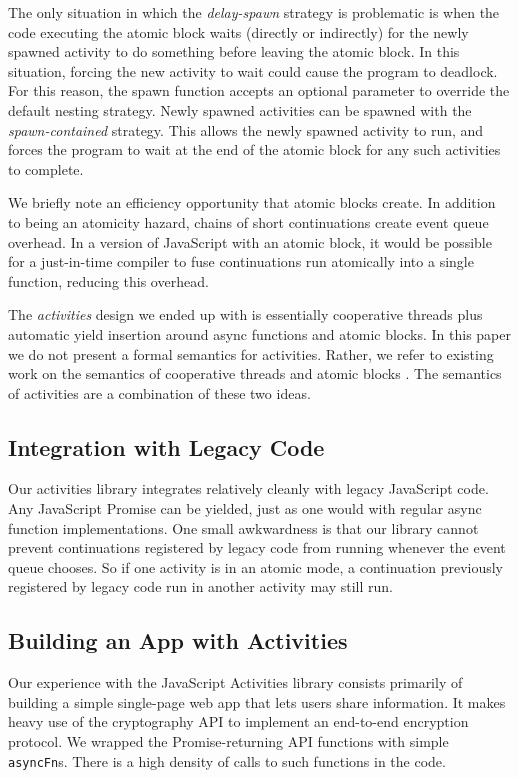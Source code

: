 \documentclass[sigplan,10pt,review,anonymous]{acmart}\settopmatter{printfolios=true,printccs=false,printacmref=false}
\begin{document}
The only situation in which the \emph{delay-spawn} strategy is problematic is when the code executing the atomic block waits (directly or indirectly) for the newly spawned activity to do something before leaving the atomic block.
In this situation, forcing the new activity to wait could cause the program to deadlock.
For this reason, the spawn function accepts an optional parameter to override the default nesting strategy.
Newly spawned activities can be spawned with the \emph{spawn-contained} strategy.
This allows the newly spawned activity to run, and forces the program to wait at the end of the atomic block for any such activities to complete.

We briefly note an efficiency opportunity that atomic blocks create.
In addition to being an atomicity hazard, chains of short continuations create event queue overhead.
In a version of JavaScript with an atomic block, it would be possible for a just-in-time compiler to fuse continuations run atomically into a single function, reducing this overhead.

The \emph{activities} design we ended up with is essentially cooperative threads plus automatic yield insertion around async functions and atomic blocks.
In this paper we do not present a formal semantics for activities.
Rather, we refer to existing work on the semantics of cooperative threads \cite{Abadi2009} and atomic blocks \cite{Moore2008}.
The semantics of activities are a combination of these two ideas.

\subsection{Integration with Legacy Code}

Our activities library integrates relatively cleanly with legacy JavaScript code.
Any JavaScript Promise can be yielded, just as one would with regular async function implementations.
One small awkwardness is that our library cannot prevent continuations registered by legacy code from running whenever the event queue chooses.
So if one activity is in an atomic mode, a continuation previously registered by legacy code run in another activity may still run.

\subsection{Building an App with Activities}

Our experience with the JavaScript Activities library consists primarily of building a simple single-page web app that lets users share information.
It makes heavy use of the cryptography API to implement an end-to-end encryption protocol.
We wrapped the Promise-returning API functions with simple \texttt{asyncFn}s.
There is a high density of calls to such functions in the code.
\end{document}
